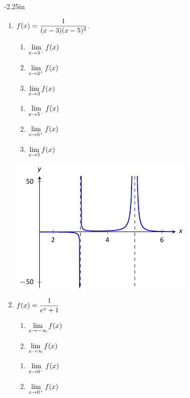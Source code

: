 \begin{adjustwidth*}{}{-2.25in}
\begin{multicols*}{2}
\begin{enumerate}[1),resume]
\item
{$\displaystyle f(x) = \frac{1}{(x-3)(x-5)^2}$.

\begin{minipage}[t]{.5\linewidth}
\begin{enumerate}
\item		$\displaystyle \lim_{x\to 3^-} f(x)$
\item		$\displaystyle \lim_{x\to 3^+} f(x)$
\item		$\displaystyle \lim_{x\to 3} f(x)$
\end{enumerate}
\end{minipage}
\begin{minipage}[t]{.5\linewidth}
\begin{enumerate}\addtocounter{enumii}{3}
\item		$\displaystyle \lim_{x\to 5^-} f(x)$
\item		$\displaystyle \lim_{x\to 5^+} f(x)$
\item		$\displaystyle \lim_{x\to 5} f(x)$
\end{enumerate}
\end{minipage}

\includegraphics[scale=.8]{figures/fig01_06_ex_10}
}

\item
{$\displaystyle f(x) = \frac{1}{e^x+1}$

\begin{minipage}[t]{.5\linewidth}
\begin{enumerate}
\item		$\displaystyle \lim_{x\to -\infty} f(x)$
\item		$\displaystyle \lim_{x\to \infty} f(x)$
\end{enumerate}
\end{minipage}
\begin{minipage}[t]{.5\linewidth}
\begin{enumerate}\addtocounter{enumii}{2}
\item		$\displaystyle \lim_{x\to 0^-} f(x)$
\item		$\displaystyle \lim_{x\to 0^+} f(x)$
\end{enumerate}
\end{minipage}

}
\end{enumerate}
\end{multicols*}
\end{adjustwidth*}
